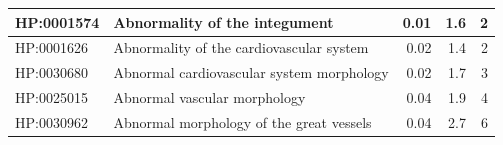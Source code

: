 \documentclass[
]{article}
\begin{document}
\begin{table}
{\begin{tabular}[t]{l|l|r|r|r}
\hline
\hspace{1em}HP:0001574 & Abnormality of the integument & 0.01 & 1.6 & 2\\
\hline
\hspace{1em}HP:0001626 & Abnormality of the cardiovascular system & 0.02 & 1.4 & 2\\
\hline
\hspace{1em}HP:0030680 & Abnormal cardiovascular system morphology & 0.02 & 1.7 & 3\\
\hline
\hspace{1em}HP:0025015 & Abnormal vascular morphology & 0.04 & 1.9 & 4\\
\hline
\hspace{1em}HP:0030962 & Abnormal morphology of the great vessels & 0.04 & 2.7 & 6\\
\hline
\end{tabular}

}

\end{table}%

\newpage{}
\end{document}
